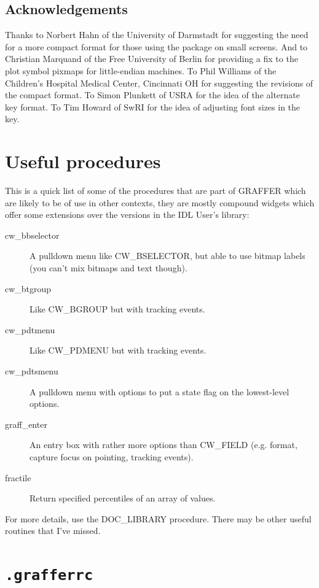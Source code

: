 \documentclass[11pt,twoside,english]{article}
\begin{document}
\subsection*{Acknowledgements}

Thanks to Norbert Hahn of the University of Darmstadt for suggesting
the need for a more compact format for those using the package on small
screens. And to Christian Marquand of the Free University of Berlin for
providing a fix to the plot symbol pixmaps for little-endian
machines. To Phil Williams of the Children's Hospital Medical Center,
Cincinnati OH for suggesting the revisions of the compact format. To
Simon Plunkett of USRA for the idea of the alternate key format. To Tim
Howard of SwRI for the idea of adjusting font sizes in the key.

\appendix

\section{Useful procedures}

This is a quick list of some of the procedures that are part of GRAFFER
which are likely to be of use in other contexts, they are mostly
compound widgets which offer some extensions over the versions in the
IDL User's library:

\begin{description}
\item [cw\_bbselector]A pulldown menu like CW\_BSELECTOR, but able to
  use bitmap labels (you can't mix bitmaps and text though).
\item [cw\_btgroup]Like CW\_BGROUP but with tracking events.
\item [cw\_pdtmenu]Like CW\_PDMENU but with tracking events.
\item [cw\_pdtsmenu]A pulldown menu with options to put a state flag on
  the lowest-level options.
\item [graff\_enter]An entry box with rather more options than
  CW\_FIELD (e.g. format, capture focus on pointing, tracking events).
\item [fractile]Return specified percentiles of an array of values.
\end{description}
For more details, use the DOC\_LIBRARY procedure. There may be other
useful routines that I've missed.

\section{\texttt{.grafferrc}}
\label{sec:grafferrc}
\end{document}
